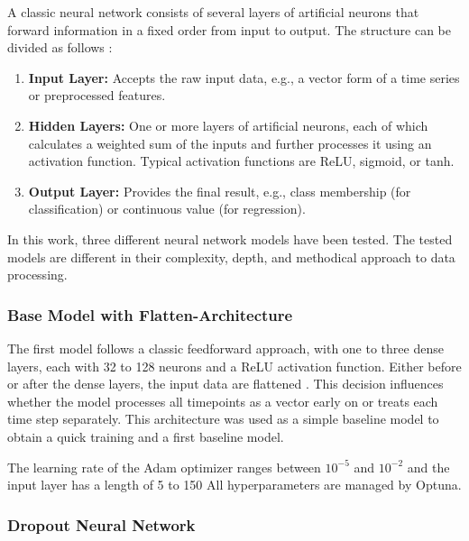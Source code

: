 A classic neural network consists of several layers of artificial neurons that forward information in a fixed order from input to output.
The structure can be divided as follows \cite{nn-basics}:

\begin{enumerate}
    \item \textbf{Input Layer:} Accepts the raw input data, e.g., a vector form of a time series or preprocessed features.
    \item \textbf{Hidden Layers:} One or more layers of artificial neurons, each of which calculates a weighted sum of the inputs and further processes it using an activation function.
    Typical activation functions are ReLU, sigmoid, or tanh.
    \item \textbf{Output Layer:} Provides the final result, e.g., class membership (for classification) or continuous value (for regression).
\end{enumerate}

In this work, three different neural network models have been tested.
The tested models are different in their complexity, depth, and methodical approach to data processing.

\subsubsection{Base Model with Flatten-Architecture}

The first model follows a classic feedforward approach, with one to three dense layers, each with 32 to 128 neurons and a ReLU activation function.
Either before or after the dense layers, the input data are flattened \cite{keras-flatten}.
This decision influences whether the model processes all timepoints as a vector early on or treats each time step separately.
This architecture was used as a simple baseline model to obtain a quick training and a first baseline model.

The learning rate of the Adam optimizer ranges between $10^{-5}$ and $10^{-2}$ and the input layer has a length of 5 to 150
All hyperparameters are managed by Optuna.



\subsubsection{Dropout Neural Network}

